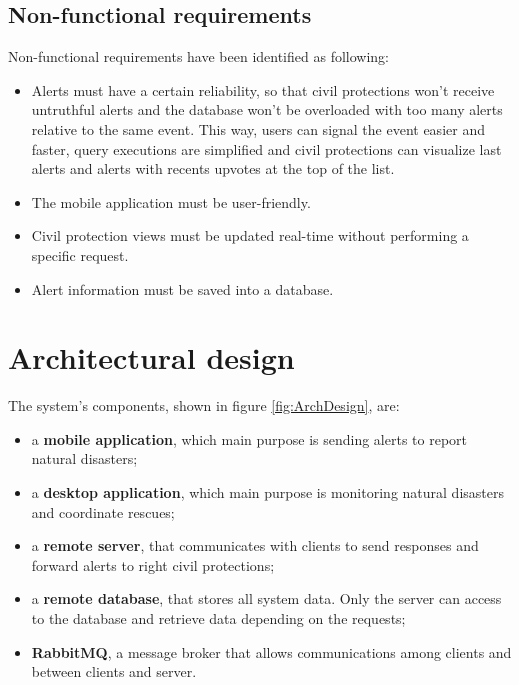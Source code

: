 \documentclass[a4paper,12pt]{report}
\begin{document}
\section{Non-functional requirements}
Non-functional requirements have been identified as following:

\begin{itemize}
\item Alerts must have a certain reliability, so that civil protections won't receive untruthful alerts and the database won't be overloaded with too many alerts relative to the same event. This way, users can signal the event easier and faster, query executions are simplified and civil protections can visualize last alerts and alerts with recents upvotes at the top of the list.
\item The mobile application must be user-friendly.
\item Civil protection views must be updated real-time without performing a specific request.
\item Alert information must be saved into a database.
\end{itemize}

\chapter{Architectural design}

The system's components, shown in figure \ref{fig:ArchDesign}, are:

\begin{itemize}
\item a \textbf{mobile application}, which main purpose is sending alerts to report natural disasters;
\item a \textbf{desktop application}, which main purpose is monitoring natural disasters and coordinate rescues;
\item a \textbf{remote server}, that communicates with clients to send responses and forward alerts to right civil protections;
\item a \textbf{remote database}, that stores all system data. Only the server can access to the database and retrieve data depending on the requests;
\item \textbf{RabbitMQ}, a message broker that allows communications among clients and between clients and server.
\end{itemize}
\end{document}
